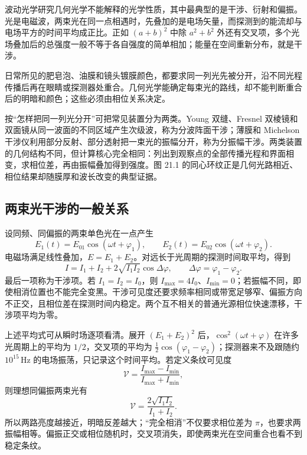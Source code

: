 波动光学研究几何光学不能解释的光学性质，其中最典型的是干涉、衍射和偏振。光是电磁波，两束光在同一点相遇时，先叠加的是电场矢量，而探测到的能流却与电场平方的时间平均成正比。正如 $(a+b)^2$ 中除 $a^2+b^2$ 外还有交叉项，多个光场叠加后的总强度一般不等于各自强度的简单相加；能量在空间重新分布，就是干涉。

日常所见的肥皂泡、油膜和镜头镀膜颜色，都要求同一列光先被分开，沿不同光程传播后再在眼睛或探测器处重合。几何光学能确定每束光的路线，却不能判断重合后的明暗和颜色；这些必须由相位关系决定。

按“怎样把同一列光分开”可把常见装置分为两类。Young 双缝、Fresnel 双棱镜和双面镜从同一波面的不同区域产生次级波，称为分波阵面干涉；薄膜和 Michelson 干涉仪利用部分反射、部分透射把一束光的振幅分开，称为分振幅干涉。两类装置的几何结构不同，但计算核心完全相同：列出到观察点的全部传播光程和界面相变，求相位差，再由振幅叠加得到强度。图 21.1 的同心环纹正是几何光路相近、相位结果却随膜厚和波长改变的典型证据。

\InterferencePhenomenaPanel

\subsection*{两束光干涉的一般关系}

设同频、同偏振的两束单色光在一点产生
\[
 E_1(t)=E_{01}\cos(\omega t+\varphi_1),\qquad
 E_2(t)=E_{02}\cos(\omega t+\varphi_2).
\]
电磁场满足线性叠加，$E=E_1+E_2$。对远长于光周期的探测时间取平均，得到
\begin{equation}
 I=I_1+I_2+2\sqrt{I_1I_2}\cos\Delta\varphi,\qquad
 \Delta\varphi=\varphi_1-\varphi_2.
\end{equation}
最后一项称为干涉项。若 $I_1=I_2=I_0$，则 $I_{\max}=4I_0$、$I_{\min}=0$；若振幅不同，即使相消位置也不能完全变黑。干涉可见度还要求频率相同或带宽足够窄、偏振方向不正交，且相位差在探测时间内稳定。两个互不相关的普通光源相位快速漂移，干涉项平均为零。

上述平均式可从瞬时场逐项看清。展开 $(E_1+E_2)^2$ 后，$\cos^2(\omega t+\varphi)$ 在许多光周期上的平均为 $1/2$，交叉项的平均为 $\tfrac12\cos(\varphi_1-\varphi_2)$；探测器来不及跟随约 $10^{15}\,\mathrm{Hz}$ 的电场振荡，只记录这个时间平均。若定义条纹可见度
\[
 \mathcal V=\frac{I_{\max}-I_{\min}}{I_{\max}+I_{\min}},
\]
则理想同偏振两束光有
\[
 \mathcal V=\frac{2\sqrt{I_1I_2}}{I_1+I_2}.
\]
所以两路亮度越接近，明暗反差越大；“完全相消”不仅要求相位差为 $\pi$，也要求两振幅相等。偏振正交或相位随机时，交叉项消失，即使两束光在空间重合也看不到稳定条纹。

